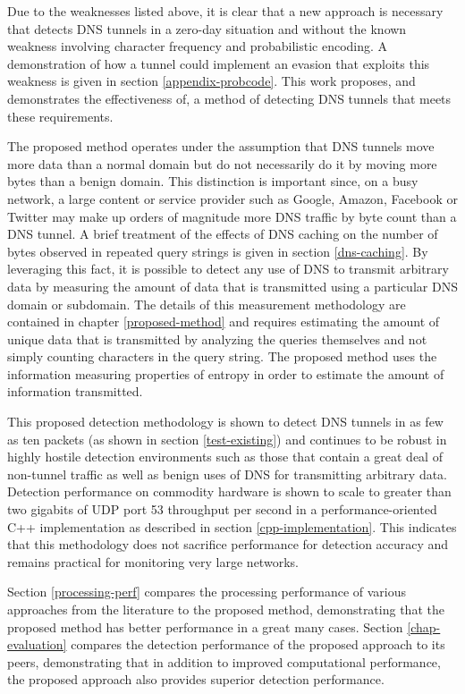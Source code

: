 \documentclass[12pt]{report}
\theoremstyle{remark}
\theoremstyle{definition}
\theoremstyle{definition}
\theoremstyle{definition}
\begin{document}
Due to the weaknesses listed above, it is clear that a new approach is necessary
that detects DNS tunnels in a zero-day situation and without the known weakness
involving character frequency and probabilistic encoding. A demonstration of how
a tunnel could implement an evasion that exploits this weakness is given in
section \ref{appendix-probcode}. This work proposes, and demonstrates the
effectiveness of, a method of detecting DNS tunnels that meets these
requirements.

The proposed method operates under the assumption that DNS tunnels move more
data than a normal domain but do not necessarily do it by moving more bytes than
a benign domain. This distinction is important since, on a busy network, a large
content or service provider such as Google, Amazon, Facebook or Twitter may make
up orders of magnitude more DNS traffic by byte count than a DNS tunnel. A brief
treatment of the effects of DNS caching on the number of bytes observed in
repeated query strings is given in section \ref{dns-caching}. By leveraging this
fact, it is possible to detect any use of DNS to transmit arbitrary data by
measuring the amount of data that is transmitted using a particular DNS domain
or subdomain. The details of this measurement methodology are contained in
chapter \ref{proposed-method} and requires estimating the amount of unique data
that is transmitted by analyzing the queries themselves and not simply counting
characters in the query string. The proposed method uses the information
measuring properties of entropy in order to estimate the amount of information
transmitted.

This proposed detection methodology is shown to detect DNS tunnels in as few as
ten packets (as shown in section \ref{test-existing}) and continues to be robust
in highly hostile detection environments such as those that contain a great deal
of non-tunnel traffic as well as benign uses of DNS for transmitting arbitrary
data. Detection performance on commodity hardware is shown to scale to greater
than two gigabits of UDP port 53 throughput per second in a performance-oriented
C++ implementation as described in section \ref{cpp-implementation}. This indicates
that this methodology does not sacrifice performance for detection accuracy and
remains practical for monitoring very large networks.

Section \ref{processing-perf} compares the processing performance of various
approaches from the literature to the proposed method, demonstrating that the
proposed method has better performance in a great many cases. Section
\ref{chap-evaluation} compares the detection performance of the proposed
approach to its peers, demonstrating that in addition to improved computational
performance, the proposed approach also provides superior detection performance.
\end{document}
